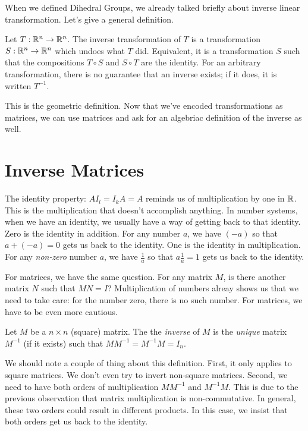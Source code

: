 \documentclass[fleqn]{report}
\begin{document}
When we defined Dihedral Groups, we already talked briefly
about inverse linear transformation. Let's give a general
definition.

\begin{defn}
Let $T: \mathbb{R}^n \rightarrow \mathbb{R}^n$. The inverse transformation
of $T$ is a transformation $S: \mathbb{R}^n \rightarrow \mathbb{R}^n$ which
undoes what $T$ did. Equivalent, it is a transformation $S$
such that the compositions $T \circ S$ and $S \circ T$ are the
identity. For an arbitrary transformation, there is no
guarantee that an inverse exists; if it does, it is written
$T^{-1}$. 
\end{defn}

This is the geometric definition. Now that we've encoded
transformations as matrices, we can use matrices and ask for
an algebriac definition of the inverse as well.

\section{Inverse Matrices}

The identity property: $AI_l = I_k A = A$ reminds us of
multiplication by one in $\mathbb{R}$. This is the multiplication
that doesn't accomplish anything. In number systems, when we
have an identity, we usually have a way of getting back to
that identity. Zero is the identity in addition. For any
number $a$, we have $(-a)$ so that $a + (-a) = 0$ gets us back
to the identity. One is the identity in multiplication. For
any \emph{non-zero} number $a$, we have $\frac{1}{a}$ so that
$a \frac{1}{a} = 1$ gets us back to the identity. 

For matrices, we have the same question. For any matrix $M$, is
there another matrix $N$ such that $MN = I$? Multiplication
of numbers alreay shows us that we need to take care: for the
number zero, there is no such number. For matrices, we have
to be even more cautious.

\begin{defn}
Let $M$ be a $n \times n$ (square) matrix. The the
\emph{inverse} of $M$ is the \emph{unique} matrix $M^{-1}$ (if
it exists) such that $MM^{-1} = M^{-1}M = I_n$.
\end{defn}

We should note a couple of thing about this definition. First,
it only applies to square matrices. We don't even try to
invert non-square matrices. Second, we need to have both
orders of multiplication $MM^{-1}$ and $M^{-1}M$. This is due
to the previous observation that matrix multiplication is
non-commutative. In general, these two orders could result in
different products. In this case, we insist that both orders
get us back to the identity.
\end{document}
